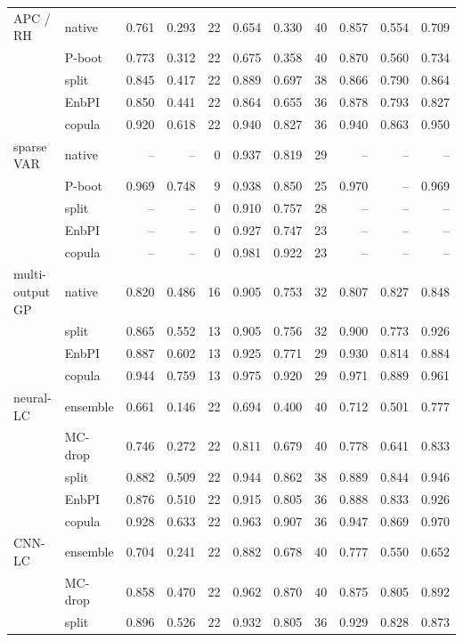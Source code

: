 \begin{threeparttable}
\begin{tabular}{@{}llrrrrrrrrr@{}}
\addlinespace[1pt]
APC / RH & native & 0.761 & 0.293 & 22 & 0.654 & 0.330 & 40 & 0.857 & 0.554 & 0.709 \\
 & P-boot & 0.773 & 0.312 & 22 & 0.675 & 0.358 & 40 & 0.870 & 0.560 & 0.734 \\
 & split & 0.845 & 0.417 & 22 & 0.889 & 0.697 & 38 & 0.866 & 0.790 & 0.864 \\
 & EnbPI & 0.850 & 0.441 & 22 & 0.864 & 0.655 & 36 & 0.878 & 0.793 & 0.827 \\
 & copula & 0.920 & 0.618 & 22 & 0.940 & 0.827 & 36 & 0.940 & 0.863 & 0.950 \\
\addlinespace[1pt]
sparse VAR & native & -- & -- & 0 & 0.937 & 0.819 & 29 & -- & -- & -- \\
 & P-boot & 0.969 & 0.748 & 9 & 0.938 & 0.850 & 25 & 0.970 & -- & 0.969 \\
 & split & -- & -- & 0 & 0.910 & 0.757 & 28 & -- & -- & -- \\
 & EnbPI & -- & -- & 0 & 0.927 & 0.747 & 23 & -- & -- & -- \\
 & copula & -- & -- & 0 & 0.981 & 0.922 & 23 & -- & -- & -- \\
\addlinespace[1pt]
multi-output GP & native & 0.820 & 0.486 & 16 & 0.905 & 0.753 & 32 & 0.807 & 0.827 & 0.848 \\
 & split & 0.865 & 0.552 & 13 & 0.905 & 0.756 & 32 & 0.900 & 0.773 & 0.926 \\
 & EnbPI & 0.887 & 0.602 & 13 & 0.925 & 0.771 & 29 & 0.930 & 0.814 & 0.884 \\
 & copula & 0.944 & 0.759 & 13 & 0.975 & 0.920 & 29 & 0.971 & 0.889 & 0.961 \\
\addlinespace[1pt]
neural-LC & ensemble & 0.661 & 0.146 & 22 & 0.694 & 0.400 & 40 & 0.712 & 0.501 & 0.777 \\
 & MC-drop & 0.746 & 0.272 & 22 & 0.811 & 0.679 & 40 & 0.778 & 0.641 & 0.833 \\
 & split & 0.882 & 0.509 & 22 & 0.944 & 0.862 & 38 & 0.889 & 0.844 & 0.946 \\
 & EnbPI & 0.876 & 0.510 & 22 & 0.915 & 0.805 & 36 & 0.888 & 0.833 & 0.926 \\
 & copula & 0.928 & 0.633 & 22 & 0.963 & 0.907 & 36 & 0.947 & 0.869 & 0.970 \\
\addlinespace[1pt]
CNN-LC & ensemble & 0.704 & 0.241 & 22 & 0.882 & 0.678 & 40 & 0.777 & 0.550 & 0.652 \\
 & MC-drop & 0.858 & 0.470 & 22 & 0.962 & 0.870 & 40 & 0.875 & 0.805 & 0.892 \\
 & split & 0.896 & 0.526 & 22 & 0.932 & 0.805 & 36 & 0.929 & 0.828 & 0.873 \\

\end{tabular}
\end{threeparttable}

